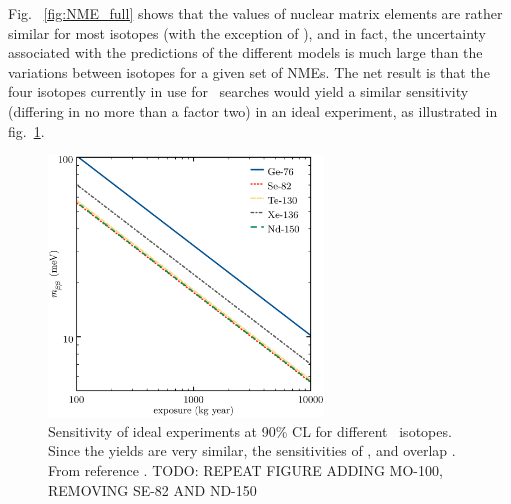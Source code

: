 Fig.~ \ref{fig:NME_full} shows that the values of nuclear matrix elements are rather similar for most isotopes (with the exception of ), and in fact, the uncertainty associated with the predictions of the different models is much large than the variations between isotopes for a given set of NMEs. The net result is that the four isotopes currently in use for \bbonu\ searches would yield a similar sensitivity (differing in no more than a factor two) in an ideal experiment, as illustrated in fig.~\ref{fig:SensiIdeal}.
 
\begin{figure}[t!b!]
\begin{center}
\includegraphics[width=0.65\textwidth]{img/isotopes_sensi.eps}
\end{center}
\caption{Sensitivity of ideal experiments at 90\% CL for different \bb\ isotopes. Since the yields are very similar, the sensitivities of ,  and  overlap . From reference \cite{Gomez-Cadenas:2010zcc}. TODO: REPEAT FIGURE ADDING MO-100, REMOVING SE-82 AND ND-150} \label{fig:SensiIdeal}	
\end{figure}

